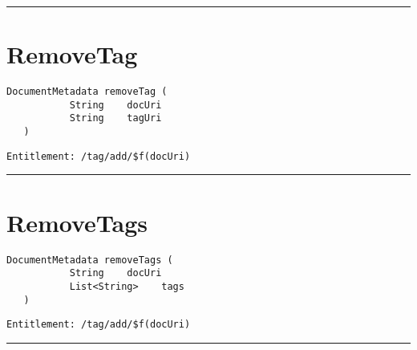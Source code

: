 \rule{12cm}{2pt}
\section{RemoveTag}
\label{Api:RemoveTag}
\begin{lstlisting}[style=nonumbers]
   DocumentMetadata removeTag (
           String    docUri
           String    tagUri
   )
\end{lstlisting}
\begin{Verbatim}[formatcom=\color{Maroon}]
  Entitlement: /tag/add/$f(docUri)
\end{Verbatim}



\rule{12cm}{2pt}
\section{RemoveTags}
\label{Api:RemoveTags}
\begin{lstlisting}[style=nonumbers]
   DocumentMetadata removeTags (
           String    docUri
           List<String>    tags
   )
\end{lstlisting}
\begin{Verbatim}[formatcom=\color{Maroon}]
  Entitlement: /tag/add/$f(docUri)
\end{Verbatim}



\rule{12cm}{2pt}
